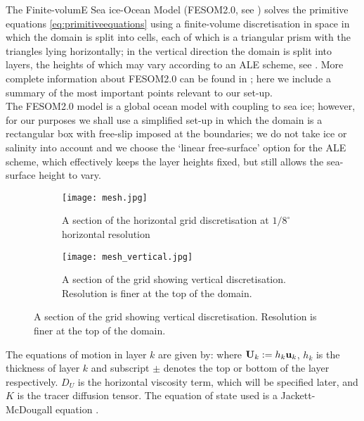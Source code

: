 The Finite-volumE Sea ice-Ocean Model (FESOM2.0, see \cite{danilov_sidorenko_wang_jung_2016}) solves the primitive equations \cref{eq:primitiveequations} using a finite-volume discretisation in space in which the domain is split into cells, each of which is a triangular prism with the triangles lying horizontally; in the vertical direction the domain is split into layers, the heights of which may vary according to an ALE scheme, see \cite{donea_huerta_ponthot_rodriguez-ferran_2004}. More complete information about FESOM2.0 can be found in \cite{danilov_sidorenko_wang_jung_2016}; here we include a summary of the most important points relevant to our set-up.\\
\indnt The FESOM2.0 model is a global ocean model with coupling to sea ice; however, for our purposes we shall use a simplified set-up in which the domain is a rectangular box with free-slip imposed at the boundaries; we do not take ice or salinity into account and we choose the `linear free-surface' option for the ALE scheme, which effectively keeps the layer heights fixed, but still allows the sea-surface height to vary.
\begin{figure}[H]
\centering
\begin{subfigure}{0.45\textwidth}
  \centering
  \texttt{[image: mesh.jpg]}
    \captionsetup{width=.8\linewidth}
  \caption{\footnotesize A section of the horizontal grid discretisation at $1/8^\circ$  horizontal resolution}
\end{subfigure}%
\begin{subfigure}{0.45\textwidth}
  \centering
  \texttt{[image: mesh\_vertical.jpg]}
    \captionsetup{width=.8\linewidth}
  \caption{ \footnotesize A section of the grid showing vertical discretisation. Resolution is finer at the top of the domain. }
\end{subfigure}
\end{figure}

The equations of motion in layer $k$ are given by:
where $\mathbf{U}_{k} := h_{k}\mathbf{u}_{k}$, $h_{k}$ is the thickness of layer $k$ and subscript $\pm$ denotes the top or bottom of the layer respectively. $D_{U}$ is the horizontal viscosity term, which will be specified later, and $K$ is the tracer diffusion tensor. The equation of state used is a Jackett-McDougall equation \cite{jackett_mcdougall_1995}. 

